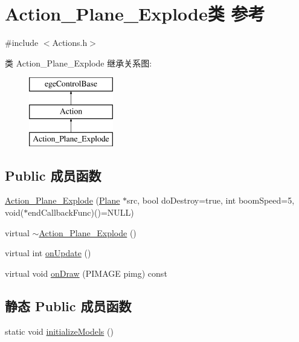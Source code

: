 \hypertarget{class_action___plane___explode}{}\section{Action\+\_\+\+Plane\+\_\+\+Explode类 参考}
\label{class_action___plane___explode}


{\ttfamily \#include $<$Actions.\+h$>$}

类 Action\+\_\+\+Plane\+\_\+\+Explode 继承关系图\+:\begin{figure}[H]
\begin{center}
\leavevmode
\includegraphics[height=3.000000cm]{class_action___plane___explode}
\end{center}
\end{figure}
\subsection*{Public 成员函数}
\begin{DoxyCompactItemize}
\item 
\hyperlink{class_action___plane___explode_aa7aeb998cd636ad6d0b42d9e23a43b57}{Action\+\_\+\+Plane\+\_\+\+Explode} (\hyperlink{class_plane}{Plane} $\ast$src, bool do\+Destroy=true, int boom\+Speed=5, void($\ast$end\+Callback\+Func)()=N\+U\+LL)
\item 
virtual \hyperlink{class_action___plane___explode_a1cfe86e64ece12731955275b8d6b9a41}{$\sim$\+Action\+\_\+\+Plane\+\_\+\+Explode} ()
\item 
virtual int \hyperlink{class_action___plane___explode_a1786450893420df4539056e93dcdc3b6}{on\+Update} ()
\item 
virtual void \hyperlink{class_action___plane___explode_a8436b3848df9d2f27434d5b7bebea525}{on\+Draw} (P\+I\+M\+A\+GE pimg) const
\end{DoxyCompactItemize}
\subsection*{静态 Public 成员函数}
\begin{DoxyCompactItemize}
\item 
static void \hyperlink{class_action___plane___explode_a797e8de15934ea7370086bde4cc45015}{initialize\+Models} ()
\end{DoxyCompactItemize}

